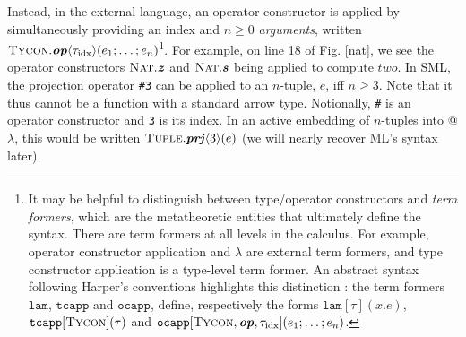 \documentclass[9pt,preprint]{sigplanconf}
\begin{document}
Instead, in the external language, an operator constructor is applied by simultaneously providing an index and  $n \geq 0$ \emph{arguments}, written ${\textsc{Tycon}.\textbf{\textit{op}}\langle{\tau_{\text{idx}}}\rangle(e_{1};\ldots;e_{n})}$\footnote{It may be helpful to distinguish between type/operator constructors and \emph{term formers}, which are the metatheoretic entities that ultimately define the syntax. There are term formers at all levels in the calculus. For example, operator constructor application and $\lambda$ are  external term formers, and type constructor application is a type-level term former. An abstract syntax following Harper's conventions highlights this distinction \cite{pfpl}: the term formers $\mathtt{lam}$, $\mathtt{tcapp}$ and $\mathtt{ocapp}$, define, respectively the forms $\mathtt{lam}[\tau](x.e)$, $\texttt{tcapp}[\textsc{Tycon}](\tau)$ and $\mathtt{ocapp}[\textsc{Tycon}, \textbf{\textit{op}}, {\tau_{\text{idx}}}](e_{1};\ldots;e_{n})$.}. For example, on line 18 of Fig. \ref{nat}, we see the operator constructors $\textsc{Nat}.\textbf{\textit{z}}$ and $\textsc{Nat}.\textbf{\textit{s}}$ being applied to compute $two$. In SML, the projection operator \verb|#3| can be applied to an $n$-tuple, $e$, iff $n \geq 3$. Note that it thus cannot be a function with a standard arrow type. Notionally, \verb|#| is an operator constructor and \verb|3| is its index. In an active embedding of $n$-tuples into @$\lambda$, this would be written ${\textsc{Tuple}.\textbf{\textit{prj}}\langle3\rangle(e)}$ (we will nearly recover ML's syntax later). %
\end{document}
